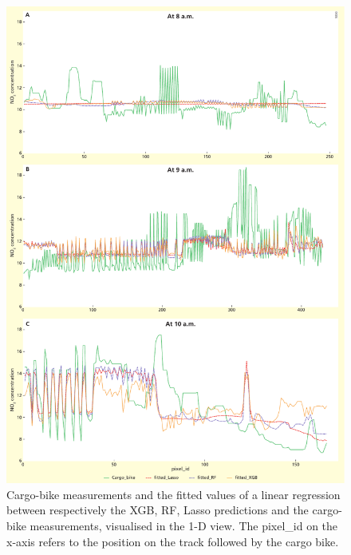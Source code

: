 \documentclass{article}
\begin{document}
\begin{figure}[H]
    \includegraphics[width=\linewidth]{graphs.pdf}
    
    \caption {Cargo-bike measurements and the fitted values of a linear regression between respectively the XGB,  RF, Lasso predictions and the cargo-bike measurements, visualised in the 1-D view. The pixel\_id on the x-axis refers to the position on the track followed by the cargo bike.}
    \label{a1d}
\end{figure}

 
\end{document}
